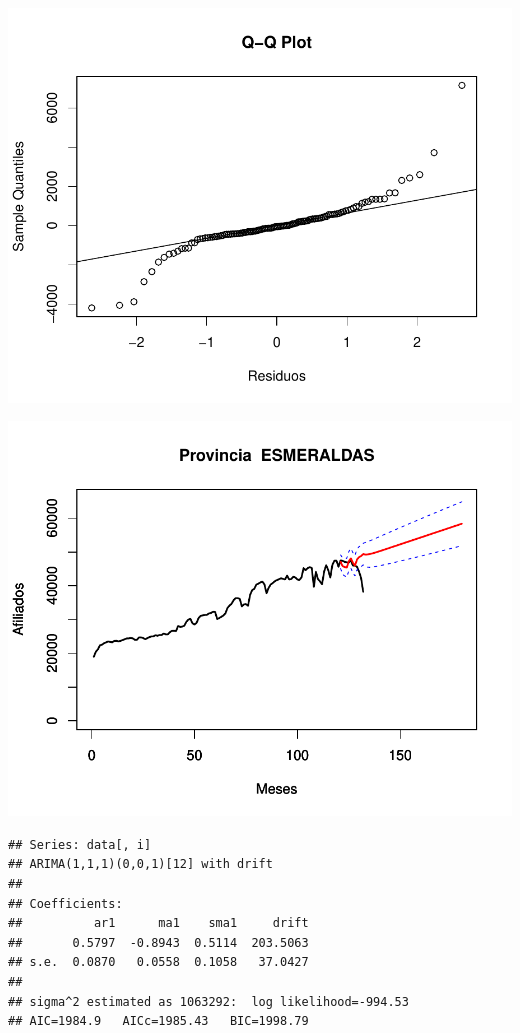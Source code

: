 \documentclass[11pt,a4paper,oneside]{article}\usepackage[]{graphicx}\usepackage[]{color}
\makeatletter
\def\maxwidth{ %
  \ifdim\Gin@nat@width>\linewidth
    \linewidth
  \else
    \Gin@nat@width
  \fi
}
\newenvironment{kframe}{%
 \def\at@end@of@kframe{}%
 \ifinner\ifhmode%
  \def\at@end@of@kframe{\end{minipage}}%
  \begin{minipage}{\columnwidth}%
 \fi\fi%
 \def\FrameCommand##1{\hskip\@totalleftmargin \hskip-\fboxsep
 \colorbox{shadecolor}{##1}\hskip-\fboxsep
     \hskip-\linewidth \hskip-\@totalleftmargin \hskip\columnwidth}%
 \MakeFramed {\advance\hsize-\width
   \@totalleftmargin\z@ \linewidth\hsize
   \@setminipage}}%
 {\par\unskip\endMakeFramed%
 \at@end@of@kframe}
\newenvironment{knitrout}{}{} %
\makeatother
\begin{document}
\begin{knitrout}
{}




{\centering \includegraphics[width=\maxwidth]{figure/unnamed-chunk-16-21} 

}




{\centering \includegraphics[width=\maxwidth]{figure/unnamed-chunk-16-22} 

}


\begin{kframe}\begin{verbatim}
## Series: data[, i] 
## ARIMA(1,1,1)(0,0,1)[12] with drift         
## 
## Coefficients:
##          ar1      ma1    sma1     drift
##       0.5797  -0.8943  0.5114  203.5063
## s.e.  0.0870   0.0558  0.1058   37.0427
## 
## sigma^2 estimated as 1063292:  log likelihood=-994.53
## AIC=1984.9   AICc=1985.43   BIC=1998.79
\end{verbatim}
\end{kframe}


\end{knitrout}
\end{document}
